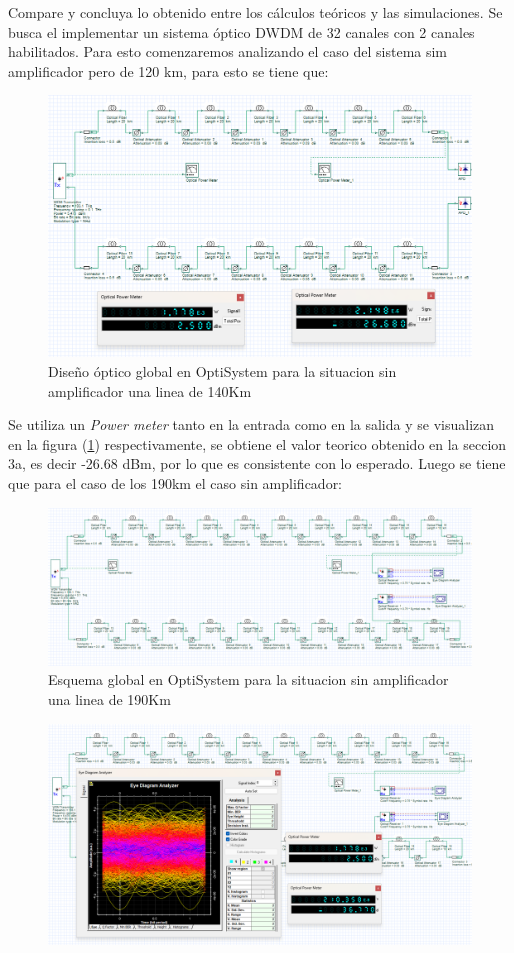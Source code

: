 \begin{enumerate}
\begin{itemize}
			Compare y concluya lo obtenido entre los cálculos teóricos y las simulaciones.
		Se busca el implementar un sistema óptico DWDM de 32 canales con 2 canales habilitados. Para esto comenzaremos analizando el caso del sistema sim amplificador pero de 120 km, para esto se tiene que:
		\begin{figure}
			\centering
			\includegraphics[width=0.9\linewidth]{img/Figure_6_0}
			\caption{Diseño óptico global en OptiSystem para la situacion sin amplificador una linea de 140Km}
			\label{fig:8}
		\end{figure}
		Se utiliza un \textit{Power meter} tanto en la entrada como en la salida y se visualizan en la figura (\ref{fig:8}) respectivamente, se obtiene el valor teorico obtenido en la seccion 3a, es decir -26.68 dBm, por lo que es consistente con lo esperado. Luego se tiene que para el caso de los 190km el caso sin amplificador:
		\begin{figure}
			\centering
			\includegraphics[width=0.9\linewidth]{img/Figure_6_1}
			\caption{Esquema global en OptiSystem para la situacion sin amplificador una linea de 190Km}
			\label{fig:9}
		\end{figure}
		\begin{figure}
			\centering
			\includegraphics[width=0.9\linewidth]{img/Figure_6_2}

\end{figure}
\end{itemize}
\end{enumerate}
